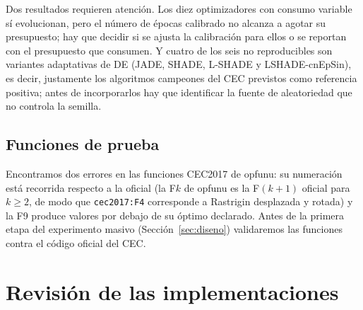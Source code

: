 \documentclass[11pt,letterpaper]{article}
\begin{document}
Dos resultados requieren atención. Los diez optimizadores con consumo variable sí evolucionan, pero el número de épocas calibrado no alcanza a agotar su presupuesto; hay que decidir si se ajusta la calibración para ellos o se reportan con el presupuesto que consumen. Y cuatro de los seis no reproducibles son variantes adaptativas de DE (JADE, SHADE, L-SHADE y LSHADE-cnEpSin), es decir, justamente los algoritmos campeones del CEC previstos como referencia positiva; antes de incorporarlos hay que identificar la fuente de aleatoriedad que no controla la semilla.

\subsection{Funciones de prueba}

Encontramos dos errores en las funciones CEC2017 de opfunu: su numeración está recorrida respecto a la oficial (la F$k$ de opfunu es la F$(k{+}1)$ oficial para $k\ge2$, de modo que \texttt{cec2017:F4} corresponde a Rastrigin desplazada y rotada) y la F9 produce valores por debajo de su óptimo declarado. Antes de la primera etapa del experimento masivo (Sección~\ref{sec:diseno}) validaremos las funciones contra el código oficial del CEC.

\section{Revisión de las implementaciones}\label{sec:revision}
\end{document}

